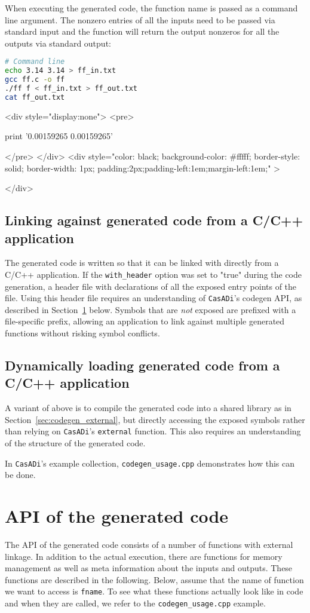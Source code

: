 \documentclass[a4paper,12pt]{book}
\newcommand{\CasADi}{\texttt{CasADi}\xspace}
\newcounter{pytexcount}
\newcounter{pytexsubcount}
\renewenvironment{pytexoutput}
{\addtocounter{pytexsubcount}{1}%
\begin{rawhtml}
<div style="display:none">
<pre>
\end{rawhtml}
}%
{\begin{rawhtml}
</pre>
</div>
<div style="color: black; background-color: \#fffff;  border-style: solid; border-width: 1px; padding:2px;padding-left:1em;margin-left:1em;" >\end{rawhtml}%
\verbatiminputeval{pytex_\alph{pytexcount}_\arabic{pytexsubcount}.log}%
\begin{rawhtml}
</div>
\end{rawhtml}
}
\begin{document}
When executing the generated code, the function name is passed
as a command line argument. The nonzero entries of all the inputs
need to be passed via standard input and the function will return the output
nonzeros for all the outputs via standard output:

\begin{lstlisting}[language=sh]
# Command line
echo 3.14 3.14 > ff_in.txt
gcc ff.c -o ff
./ff f < ff_in.txt > ff_out.txt
cat ff_out.txt
\end{lstlisting}
\begin{pytexoutput}
print '0.00159265 0.00159265'
\end{pytexoutput}

\subsection*{Linking against generated code from a C/C++ application}
The generated code is written so that it can be linked with directly from a C/C++
application. If the \verb|with_header| option was set to "true" during the
code generation, a header file with declarations of all the exposed entry points
of the file. Using this header file requires an understanding of \CasADi's
codegen API, as described in Section~\ref{sec:c_api} below. Symbols that are
\emph{not} exposed are prefixed with a file-specific prefix, allowing an
application to link against multiple generated functions without risking
symbol conflicts.

\subsection*{Dynamically loading generated code from a C/C++ application}
A variant of above is to compile the generated code into a shared library
as in Section~\ref{sec:codegen_external}, but directly accessing the exposed
symbols rather than relying on \CasADi's \texttt{external} function. This also
requires an understanding of the structure of the generated code.

In \CasADi's example collection, \verb|codegen_usage.cpp| demonstrates how this
can be done.

\section{API of the generated code} \label{sec:c_api}
The API of the generated code consists of a number of functions with external
linkage. In addition to the actual execution, there are functions for memory
management as well as meta information about the inputs and outputs.
These functions are described in the following. Below, assume that the name of
function we want to access is \texttt{fname}. To see what these functions actually
look like in code and when they are called, we refer to the
\verb|codegen_usage.cpp| example.
\end{document}
